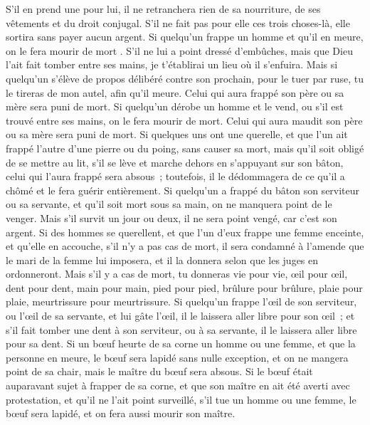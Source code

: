 \begin{multicols}{2}
S'il en prend une pour lui, il ne retranchera rien de sa nourriture, de ses vêtements et du droit conjugal.
S'il ne fait pas pour elle ces trois choses-là, elle sortira sans payer aucun argent.
Si quelqu'un frappe un homme et qu'il en meure, on le fera mourir de mort .
S'il ne lui a point dressé d'embûches, mais que Dieu l'ait fait tomber entre ses mains, je t'établirai un lieu où il s'enfuira.
Mais si quelqu'un s'élève de propos délibéré contre son prochain, pour le tuer par ruse, tu le tireras de mon autel, afin qu'il meure.
Celui qui aura frappé son père ou sa mère sera puni de mort.
Si quelqu'un dérobe un homme et le vend, ou s'il est trouvé entre ses mains, on le fera mourir de mort.
Celui qui aura maudit son père ou sa mère sera puni de mort.
Si quelques uns ont une querelle, et que l'un ait frappé l'autre d'une pierre ou du poing, sans causer sa mort, mais qu'il soit obligé de se mettre au lit,
s'il se lève et marche dehors en s'appuyant sur son bâton, celui qui l'aura frappé sera absous~; toutefois, il le dédommagera de ce qu'il a chômé et le fera guérir entièrement.
Si quelqu'un a frappé du bâton son serviteur ou sa servante, et qu'il soit mort sous sa main, on ne manquera point de le venger.
Mais s'il survit un jour ou deux, il ne sera point vengé, car c'est son argent.
Si des hommes se querellent, et que l'un d'eux frappe une femme enceinte, et qu'elle en accouche, s'il n'y a pas cas de mort, il sera condamné à l'amende que le mari de la femme lui imposera, et il la donnera selon que les juges en ordonneront.
Mais s'il y a cas de mort, tu donneras vie pour vie,
œil pour œil, dent pour dent, main pour main, pied pour pied,
brûlure pour brûlure, plaie pour plaie, meurtrissure pour meurtrissure.
Si quelqu'un frappe l'œil de son serviteur, ou l'œil de sa servante, et lui gâte l'œil, il le laissera aller libre pour son œil~;
et s'il fait tomber une dent à son serviteur, ou à sa servante, il le laissera aller libre pour sa dent.
Si un bœuf heurte de sa corne un homme ou une femme, et que la personne en meure, le bœuf sera lapidé sans nulle exception, et on ne mangera point de sa chair, mais le maître du bœuf sera absous.
Si le bœuf était auparavant sujet à frapper de sa corne, et que son maître en ait été averti avec protestation, et qu'il ne l'ait point surveillé, s'il tue un homme ou une femme, le bœuf sera lapidé, et on fera aussi mourir son maître.

\end{multicols}
